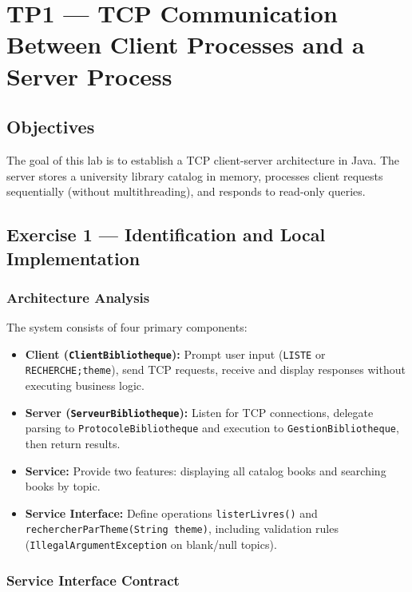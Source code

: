 \chapter{TP1 --- TCP Communication Between Client Processes and a Server Process}

\section{Objectives}

The goal of this lab is to establish a TCP client-server architecture in Java. The server stores a university library catalog in memory, processes client requests sequentially (without multithreading), and responds to read-only queries.

\section{Exercise 1 --- Identification and Local Implementation}

\subsection{Architecture Analysis}

The system consists of four primary components:
\begin{itemize}[leftmargin=*]
  \item \textbf{Client (\texttt{ClientBibliotheque}):} Prompt user input (\texttt{LISTE} or \texttt{RECHERCHE;theme}), send TCP requests, receive and display responses without executing business logic.
  \item \textbf{Server (\texttt{ServeurBibliotheque}):} Listen for TCP connections, delegate parsing to \texttt{ProtocoleBibliotheque} and execution to \texttt{GestionBibliotheque}, then return results.
  \item \textbf{Service:} Provide two features: displaying all catalog books and searching books by topic.
  \item \textbf{Service Interface:} Define operations \texttt{listerLivres()} and \texttt{rechercherParTheme(String theme)}, including validation rules (\texttt{IllegalArgumentException} on blank/null topics).
\end{itemize}

\subsection{Service Interface Contract}

